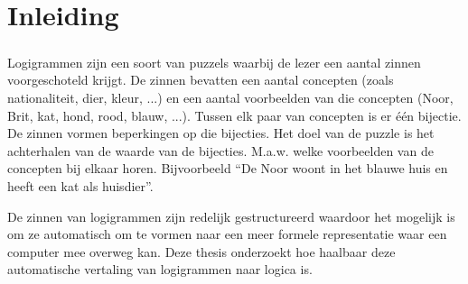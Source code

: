 \chapter{Inleiding}
\paragraph{} Logigrammen zijn een soort van puzzels waarbij de lezer een aantal zinnen voorgeschoteld krijgt. De zinnen bevatten een aantal concepten (zoals nationaliteit, dier, kleur, ...) en een aantal voorbeelden van die concepten (Noor, Brit, kat, hond, rood, blauw, ...). Tussen elk paar van concepten is er \'e\'en bijectie. De zinnen vormen beperkingen op die bijecties. Het doel van de puzzle is het achterhalen van de waarde van de bijecties. M.a.w. welke voorbeelden van de concepten bij elkaar horen. Bijvoorbeeld ``De Noor woont in het blauwe huis en heeft een kat als huisdier''.

De zinnen van logigrammen zijn redelijk gestructureerd waardoor het mogelijk is om ze automatisch om te vormen naar een meer formele representatie waar een computer mee overweg kan. Deze thesis onderzoekt hoe haalbaar deze automatische vertaling van logigrammen naar logica is.
